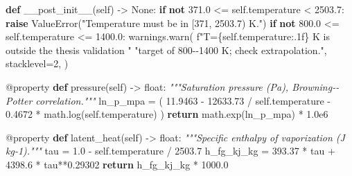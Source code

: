 \documentclass[
  12pt,
  12pt,a4paper,oneside]{report}
\newenvironment{Shaded}{}{}
\newcommand{\AttributeTok}[1]{\textcolor[rgb]{0.49,0.56,0.16}{#1}}
\newcommand{\BuiltInTok}[1]{\textcolor[rgb]{0.00,0.50,0.00}{#1}}
\newcommand{\CommentTok}[1]{\textcolor[rgb]{0.38,0.63,0.69}{\textit{#1}}}
\newcommand{\ControlFlowTok}[1]{\textcolor[rgb]{0.00,0.44,0.13}{\textbf{#1}}}
\newcommand{\DecValTok}[1]{\textcolor[rgb]{0.25,0.63,0.44}{#1}}
\newcommand{\FloatTok}[1]{\textcolor[rgb]{0.25,0.63,0.44}{#1}}
\newcommand{\KeywordTok}[1]{\textcolor[rgb]{0.00,0.44,0.13}{\textbf{#1}}}
\newcommand{\NormalTok}[1]{#1}
\newcommand{\OperatorTok}[1]{\textcolor[rgb]{0.40,0.40,0.40}{#1}}
\newcommand{\PreprocessorTok}[1]{\textcolor[rgb]{0.74,0.48,0.00}{#1}}
\newcommand{\SpecialCharTok}[1]{\textcolor[rgb]{0.25,0.44,0.63}{#1}}
\newcommand{\SpecialStringTok}[1]{\textcolor[rgb]{0.73,0.40,0.53}{#1}}
\newcommand{\StringTok}[1]{\textcolor[rgb]{0.25,0.44,0.63}{#1}}
\newcommand{\VariableTok}[1]{\textcolor[rgb]{0.10,0.09,0.49}{#1}}
\begin{document}
\begin{Shaded}
\begin{Highlighting}[]
    \KeywordTok{def}\NormalTok{ \_\_post\_init\_\_(}\VariableTok{self}\NormalTok{) }\OperatorTok{{-}\textgreater{}} \VariableTok{None}\NormalTok{:}
        \ControlFlowTok{if} \KeywordTok{not} \FloatTok{371.0} \OperatorTok{\textless{}=} \VariableTok{self}\NormalTok{.temperature }\OperatorTok{\textless{}} \FloatTok{2503.7}\NormalTok{:}
            \ControlFlowTok{raise} \PreprocessorTok{ValueError}\NormalTok{(}\StringTok{"Temperature must be in [371, 2503.7) K."}\NormalTok{)}
        \ControlFlowTok{if} \KeywordTok{not} \FloatTok{800.0} \OperatorTok{\textless{}=} \VariableTok{self}\NormalTok{.temperature }\OperatorTok{\textless{}=} \FloatTok{1400.0}\NormalTok{:}
\NormalTok{            warnings.warn(}
                \SpecialStringTok{f"T=}\SpecialCharTok{\{}\VariableTok{self}\SpecialCharTok{.}\NormalTok{temperature}\SpecialCharTok{:.1f\}}\SpecialStringTok{ K is outside the thesis validation "}
                \StringTok{"target of 800{-}{-}1400 K; check extrapolation."}\NormalTok{,}
\NormalTok{                stacklevel}\OperatorTok{=}\DecValTok{2}\NormalTok{,}
\NormalTok{            )}

    \AttributeTok{@property}
    \KeywordTok{def}\NormalTok{ pressure(}\VariableTok{self}\NormalTok{) }\OperatorTok{{-}\textgreater{}} \BuiltInTok{float}\NormalTok{:}
        \CommentTok{"""Saturation pressure (Pa), Browning{-}{-}Potter correlation."""}
\NormalTok{        ln\_p\_mpa }\OperatorTok{=}\NormalTok{ (}
            \FloatTok{11.9463} \OperatorTok{{-}} \FloatTok{12633.73} \OperatorTok{/} \VariableTok{self}\NormalTok{.temperature}
            \OperatorTok{{-}} \FloatTok{0.4672} \OperatorTok{*}\NormalTok{ math.log(}\VariableTok{self}\NormalTok{.temperature)}
\NormalTok{        )}
        \ControlFlowTok{return}\NormalTok{ math.exp(ln\_p\_mpa) }\OperatorTok{*} \FloatTok{1.0e6}

    \AttributeTok{@property}
    \KeywordTok{def}\NormalTok{ latent\_heat(}\VariableTok{self}\NormalTok{) }\OperatorTok{{-}\textgreater{}} \BuiltInTok{float}\NormalTok{:}
        \CommentTok{"""Specific enthalpy of vaporization (J kg{-}1)."""}
\NormalTok{        tau }\OperatorTok{=} \FloatTok{1.0} \OperatorTok{{-}} \VariableTok{self}\NormalTok{.temperature }\OperatorTok{/} \FloatTok{2503.7}
\NormalTok{        h\_fg\_kj\_kg }\OperatorTok{=} \FloatTok{393.37} \OperatorTok{*}\NormalTok{ tau }\OperatorTok{+} \FloatTok{4398.6} \OperatorTok{*}\NormalTok{ tau}\OperatorTok{**}\FloatTok{0.29302}
        \ControlFlowTok{return}\NormalTok{ h\_fg\_kj\_kg }\OperatorTok{*} \FloatTok{1000.0}


\end{Highlighting}
\end{Shaded}
\end{document}
